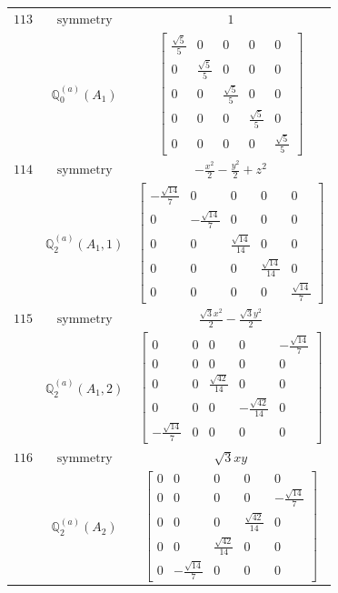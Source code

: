\documentclass[fleqn,8pt,landscape]{jsarticle}
\begin{document}
\begin{longtable}{ccc}
$ 113 $ & $ \text{symmetry} $ & $ 1 $ \\
$  $ & $ \mathbb{Q}_{0}^{(a)}(A_{1}) $ & $ \begin{bmatrix} \frac{\sqrt{5}}{5} & 0 & 0 & 0 & 0 \\ 0 & \frac{\sqrt{5}}{5} & 0 & 0 & 0 \\ 0 & 0 & \frac{\sqrt{5}}{5} & 0 & 0 \\ 0 & 0 & 0 & \frac{\sqrt{5}}{5} & 0 \\ 0 & 0 & 0 & 0 & \frac{\sqrt{5}}{5} \end{bmatrix} $ \\ \hline
$ 114 $ & $ \text{symmetry} $ & $ - \frac{x^{2}}{2} - \frac{y^{2}}{2} + z^{2} $ \\
$  $ & $ \mathbb{Q}_{2}^{(a)}(A_{1},1) $ & $ \begin{bmatrix} - \frac{\sqrt{14}}{7} & 0 & 0 & 0 & 0 \\ 0 & - \frac{\sqrt{14}}{7} & 0 & 0 & 0 \\ 0 & 0 & \frac{\sqrt{14}}{14} & 0 & 0 \\ 0 & 0 & 0 & \frac{\sqrt{14}}{14} & 0 \\ 0 & 0 & 0 & 0 & \frac{\sqrt{14}}{7} \end{bmatrix} $ \\ \hline
$ 115 $ & $ \text{symmetry} $ & $ \frac{\sqrt{3} x^{2}}{2} - \frac{\sqrt{3} y^{2}}{2} $ \\
$  $ & $ \mathbb{Q}_{2}^{(a)}(A_{1},2) $ & $ \begin{bmatrix} 0 & 0 & 0 & 0 & - \frac{\sqrt{14}}{7} \\ 0 & 0 & 0 & 0 & 0 \\ 0 & 0 & \frac{\sqrt{42}}{14} & 0 & 0 \\ 0 & 0 & 0 & - \frac{\sqrt{42}}{14} & 0 \\ - \frac{\sqrt{14}}{7} & 0 & 0 & 0 & 0 \end{bmatrix} $ \\ \hline
$ 116 $ & $ \text{symmetry} $ & $ \sqrt{3} x y $ \\
$  $ & $ \mathbb{Q}_{2}^{(a)}(A_{2}) $ & $ \begin{bmatrix} 0 & 0 & 0 & 0 & 0 \\ 0 & 0 & 0 & 0 & - \frac{\sqrt{14}}{7} \\ 0 & 0 & 0 & \frac{\sqrt{42}}{14} & 0 \\ 0 & 0 & \frac{\sqrt{42}}{14} & 0 & 0 \\ 0 & - \frac{\sqrt{14}}{7} & 0 & 0 & 0 \end{bmatrix} $ \\ \hline

\end{longtable}
\end{document}
